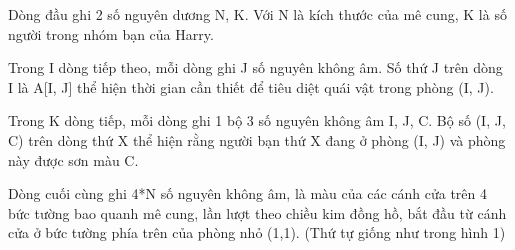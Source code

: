 Dòng đầu ghi 2 số nguyên dương N, K. Với N là kích thước của mê cung, K là số người trong nhóm bạn của Harry.

Trong I dòng tiếp theo, mỗi dòng ghi J số nguyên không âm. Số thứ J trên dòng I là A[I, J] thể hiện thời gian cần thiết để tiêu diệt quái vật trong phòng (I, J).

Trong K dòng tiếp, mỗi dòng ghi 1 bộ 3 số nguyên không âm I, J, C. Bộ số (I, J, C) trên dòng thứ X thể hiện rằng người bạn thứ X đang ở phòng (I, J) và phòng này được sơn màu C.

Dòng cuối cùng ghi 4*N số nguyên không âm, là màu của các cánh cửa trên 4 bức tường bao quanh mê cung, lần lượt theo chiều kim đồng hồ, bắt đầu từ cánh cửa ở bức tường phía trên của phòng nhỏ (1,1). (Thứ tự giống như trong hình 1)